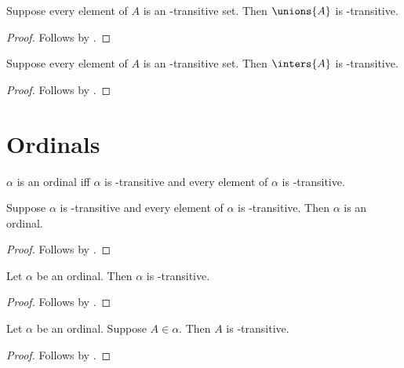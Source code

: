\begin{proposition}\label{unions_family_of_transitiveset_is_transitiveset}
    Suppose every element of $A$ is an \in-transitive set.
    Then $\unions{A}$ is \in-transitive.
\end{proposition}
\begin{proof}
    Follows by .
\end{proof}

\begin{proposition}\label{inters_family_of_transitiveset_is_transitiveset}
    Suppose every element of $A$ is an \in-transitive set.
    Then $\inters{A}$ is \in-transitive.
\end{proposition}
\begin{proof}
    Follows by .
\end{proof}


\section{Ordinals}

\begin{definition}\label{ordinal}
    $\alpha$ is an ordinal iff
    $\alpha$ is \in-transitive and
    every element of $\alpha$ is \in-transitive.
\end{definition}

\begin{proposition}\label{ordinal_intro}
    Suppose $\alpha$ is \in-transitive and
        every element of $\alpha$ is \in-transitive.
    Then $\alpha$ is an ordinal.
\end{proposition}
\begin{proof}
    Follows by .
\end{proof}

\begin{proposition}\label{ordinal_is_transitiveset}
    Let $\alpha$ be an ordinal.
    Then $\alpha$ is \in-transitive.
\end{proposition}
\begin{proof}
    Follows by .
\end{proof}

\begin{proposition}\label{ordinal_elem_is_transitiveset}
    Let $\alpha$ be an ordinal.
    Suppose $A\in\alpha$.
    Then $A$ is \in-transitive.
\end{proposition}
\begin{proof}
    Follows by .
\end{proof}


